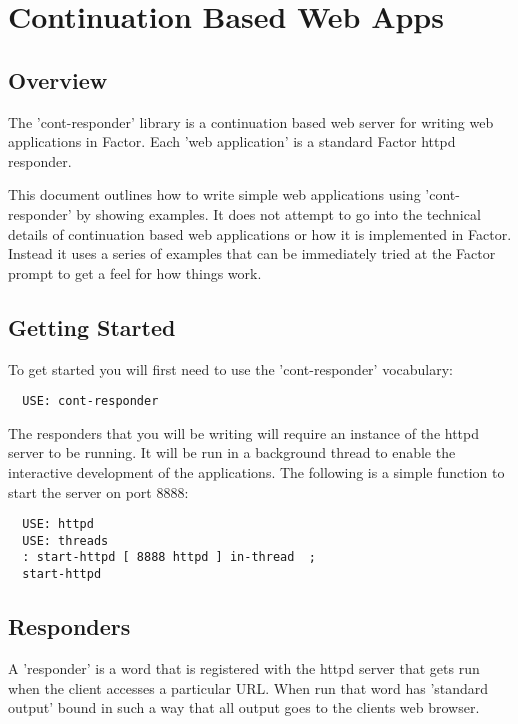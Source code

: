 \chapter{Continuation Based Web Apps}\label{contresponder}

\section{Overview}

The 'cont-responder' library is a continuation based web server
for writing web applications in Factor. Each 'web application' is a
standard Factor httpd responder.

This document outlines how to write simple web applications using
'cont-responder' by showing examples. It does not attempt to go into
the technical details of continuation based web applications or how it
is implemented in Factor. Instead it uses a series of examples that
can be immediately tried at the Factor prompt to get a feel for how
things work.

\section{Getting Started}

To get started you will first need to use the 'cont-responder'
vocabulary:

\begin{verbatim}
  USE: cont-responder
\end{verbatim}

The responders that you will be writing will require an instance of
the httpd server to be running. It will be run in a background thread
to enable the interactive development of the applications. The
following is a simple function to start the server on port 8888:

\begin{verbatim}
  USE: httpd
  USE: threads
  : start-httpd [ 8888 httpd ] in-thread  ;
  start-httpd
\end{verbatim}

\section{Responders}

A 'responder' is a word that is registered with the httpd server that
gets run when the client accesses a particular URL. When run that word
has 'standard output' bound in such a way that all output goes to the
clients web browser. 


